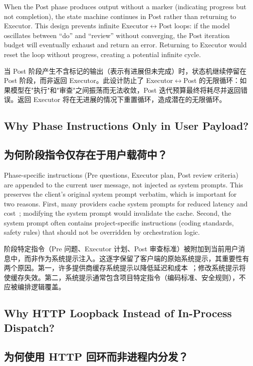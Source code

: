 When the Post phase produces output without a marker (indicating progress but not completion), the state machine continues in Post rather than returning to Executor. This design prevents infinite Executor$\leftrightarrow$Post loops: if the model oscillates between ``do'' and ``review'' without converging, the Post iteration budget will eventually exhaust and return an error. Returning to Executor would reset the loop without progress, creating a potential infinite cycle.
\begin{chinese}
当 Post 阶段产生不含标记的输出（表示有进展但未完成）时，状态机继续停留在 Post 阶段，而非返回 Executor。此设计防止了 Executor$\leftrightarrow$Post 的无限循环：如果模型在"执行"和"审查"之间振荡而无法收敛，Post 迭代预算最终将耗尽并返回错误。返回 Executor 将在无进展的情况下重置循环，造成潜在的无限循环。
\end{chinese}

\subsection{Why Phase Instructions Only in User Payload?}
\begin{chinese}
\subsection{为何阶段指令仅存在于用户载荷中？}
\end{chinese}

Phase-specific instructions (Pre questions, Executor plan, Post review criteria) are appended to the current user message, not injected as system prompts. This preserves the client's original system prompt verbatim, which is important for two reasons. First, many providers cache system prompts for reduced latency and cost~\citep{anthropic_cache}; modifying the system prompt would invalidate the cache. Second, the system prompt often contains project-specific instructions (coding standards, safety rules) that should not be overridden by orchestration logic.
\begin{chinese}
阶段特定指令（Pre 问题、Executor 计划、Post 审查标准）被附加到当前用户消息中，而非作为系统提示注入。这逐字保留了客户端的原始系统提示，其重要性有两个原因。第一，许多提供商缓存系统提示以降低延迟和成本~\citep{anthropic_cache}；修改系统提示将使缓存失效。第二，系统提示通常包含项目特定指令（编码标准、安全规则），不应被编排逻辑覆盖。
\end{chinese}

\subsection{Why HTTP Loopback Instead of In-Process Dispatch?}
\begin{chinese}
\subsection{为何使用 HTTP 回环而非进程内分发？}
\end{chinese}

